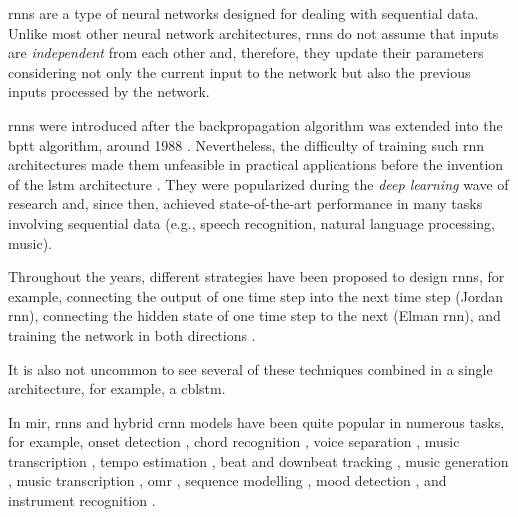 

\glspl{rnn} are a type of neural networks designed for
dealing with sequential data. Unlike most other neural
network architectures, \glspl{rnn} do not assume that inputs
are \emph{independent} from each other and, therefore, they
update their parameters considering not only the current
input to the network but also the previous inputs processed
by the network.

\glspl{rnn} were introduced after the backpropagation
algorithm \parencite{rumelhart1988learning} was extended
into the \gls{bptt} algorithm, around 1988
\parencite{werbos1988generalization,
werbos1990backpropagation}. Nevertheless, the difficulty of
training such \gls{rnn} architectures made them unfeasible
in practical applications before the invention of the \gls{lstm} architecture
\parencite{hochreiter1997long}. They were popularized during
the \emph{deep learning} wave of research and, since then,
achieved state-of-the-art performance in many tasks
involving sequential data (e.g., speech recognition, natural
language processing, music).

Throughout the years, different strategies have been
proposed to design \glspl{rnn}, for example, connecting the
output of one time step into the next time step (Jordan
\gls{rnn}), connecting the hidden state of one time step to the
next (Elman \gls{rnn}), and training the network in both
directions \parencite{schuster1997bidirectional}.

It is also not uncommon to see several of these techniques
combined in a single architecture, for example, a
\gls{cblstm}.

In \gls{mir}, \glspl{rnn} and hybrid \gls{crnn} models have
been quite popular in numerous tasks, for example, onset
detection \parencite{eyben2010universal}, chord recognition
\parencite{boulangerlewandowski2013audio, sigtia2016endend,
sears2018evaluating}, voice separation
\parencite{huang2014singingvoice}, music transcription
\parencite{sigtia2014rnnbased}, tempo estimation
\parencite{bock2015accurate}, beat and downbeat tracking
\parencite{bock2016joint, krebs2016downbeat}, music
generation \parencite{liu2016predicting, liang2017automatic,
lim2017chord}, music transcription
\parencite{rigaud2016singing, sigtia2016endend,
southall2016automatic, vogl2016recurrent,
southall2017automatic, vogl2017drum, basaran2018main},
\gls{omr} \parencite{calvozaragoza2017onestep,
wel2017optical, calvozaragoza2018cameraprimus}, sequence
modelling \parencite{ycart2017study}, mood detection
\parencite{delbouys2018music}, and instrument recognition
\parencite{gururani2018instrument}.



